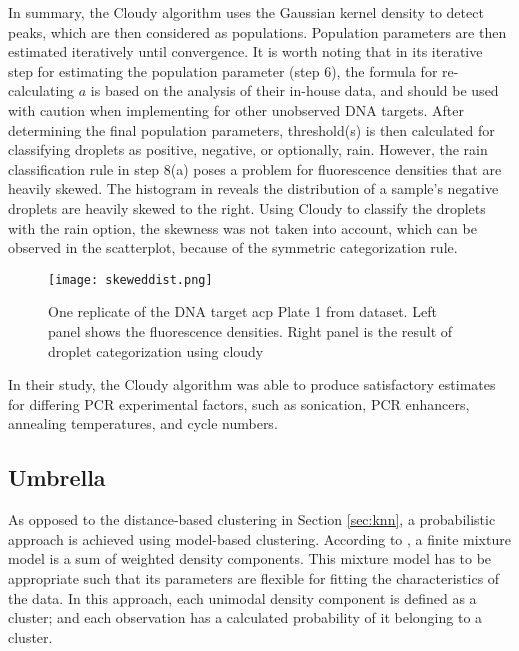 In summary, the Cloudy algorithm uses the Gaussian kernel density to detect peaks, which are then considered as populations. Population parameters are then estimated iteratively until convergence. It is worth noting that in its iterative step for estimating the population parameter (step 6), the formula for re-calculating \(a\) is based on the analysis of their in-house data, and should be used with caution when implementing for other unobserved DNA targets. After determining the final population parameters, threshold(s) is then calculated for classifying droplets as positive, negative, or optionally, rain. However, the rain classification rule in step 8(a) poses a problem for fluorescence densities that are heavily skewed. The histogram in  reveals the distribution of a sample's negative droplets are heavily skewed to the right. Using Cloudy to classify the droplets with the rain option, the skewness was not taken into account, which can be observed in the scatterplot, because of the symmetric categorization rule.

\begin{figure}[h]
    \centering
    \texttt{[image: skeweddist.png]}
    \caption[Fluorescence distribution of DNA target acp]{One replicate of the DNA target acp Plate 1 from  dataset. Left panel shows the fluorescence densities. Right panel is the result of droplet categorization using cloudy}
        \label{fig:skeweddist}
\end{figure}

In their study, the Cloudy algorithm was able to produce satisfactory estimates for differing PCR experimental factors, such as sonication, PCR enhancers, annealing temperatures, and cycle numbers.


\subsection{Umbrella}
\label{sec:nonparamdensityest}

As opposed to the distance-based clustering in Section \ref{sec:knn}, a probabilistic approach is achieved using model-based clustering. According to , a finite mixture model is a sum of weighted density components. This mixture model has to be appropriate such that its parameters are flexible for fitting the characteristics of the data. In this approach, each unimodal density component is defined as a cluster; and each observation has a calculated probability of it belonging to a cluster. 

